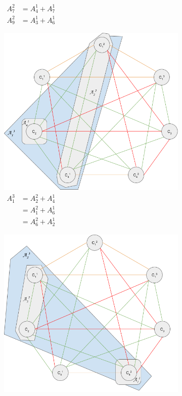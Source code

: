 \begin{figure}
\begin{subfigure}[b]{\sfwidth}
    \caption[caption]{$\begin{aligned}
              A_7^2 &= A_4^1 + A_7^1\\
              A_9^2 &= A_3^1 + A_6^1
             \end{aligned}$}
  \end{subfigure}
  \begin{subfigure}[b]{\sfwidth}
    \includegraphics[width=\textwidth]{img/split-3-class_1.png}
    \caption[caption]{$\begin{aligned}
              A_1^3 &= A_2^2 + A_4^1\\
                    &= A_1^2 + A_6^1\\
                    &= A_6^2 + A_2^1
              \end{aligned}$}
  \end{subfigure}
  \begin{subfigure}[b]{\sfwidth}
    \includegraphics[width=\textwidth]{img/split-3-class_2.png}

\end{subfigure}
\end{figure}
